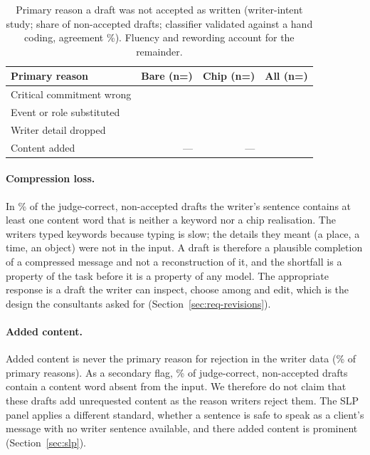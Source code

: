 \begin{table}[t]
\centering\small
\caption{Primary reason a draft was not accepted as written (writer-intent study; share of non-accepted drafts; classifier validated against a hand coding, agreement \jmwmHandAgree{}\%). Fluency and rewording account for the remainder.}\label{tab:s4-reasons}
\begin{tabular}{@{}lrrr@{}}
\toprule
Primary reason & Bare (n=\jmwmBareNotAccN{}) & Chip (n=\jmwmChipNotAccN{}) & All (n=\jmwmAllNotAccN{}) \\
\midrule
Critical commitment wrong & \jmwmBareCritical{} & \jmwmChipCritical{} & \jmwmAllCritical{} \\
Event or role substituted & \jmwmBareSubst{} & \jmwmChipSubst{} & \jmwmAllSubst{} \\
Writer detail dropped & \jmwmBareDropped{} & \jmwmChipDropped{} & \jmwmAllDropped{} \\
Content added & --- & --- & \jmwmAdded{} \\
\bottomrule
\end{tabular}
\end{table}

\paragraph{Compression loss.}
In \jmwmRightUnrec{}\% of the judge-correct, non-accepted drafts the writer's sentence contains at least one content word that is neither a keyword nor a chip realisation.
The writers typed keywords because typing is slow; the details they meant (a place, a time, an object) were not in the input.
A draft is therefore a plausible completion of a compressed message and not a reconstruction of it, and the shortfall is a property of the task before it is a property of any model.
The appropriate response is a draft the writer can inspect, choose among and edit, which is the design the consultants asked for (Section~\ref{sec:req-revisions}).

\paragraph{Added content.}
Added content is never the primary reason for rejection in the writer data (\jmwmAdded{}\% of primary reasons).
As a secondary flag, \jmwmRightAddedFlag{}\% of judge-correct, non-accepted drafts contain a content word absent from the input.
We therefore do not claim that these drafts add unrequested content as the reason writers reject them.
The SLP panel applies a different standard, whether a sentence is safe to speak as a client's message with no writer sentence available, and there added content is prominent (Section~\ref{sec:slp}).

